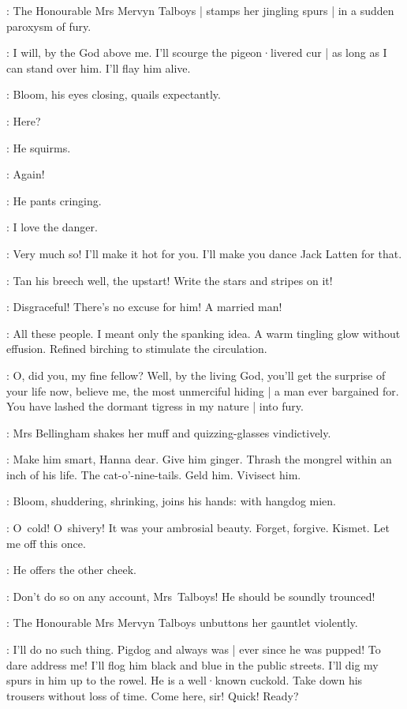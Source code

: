 :
The Honourable Mrs Mervyn Talboys |
stamps her jingling spurs |
in a sudden paroxysm of fury.

\Talboys:
I will,
by the God above me.
I'll scourge the pigeon·livered cur |
as long as I can stand over him.
I'll flay him alive.

:
Bloom,
his eyes closing,
quails expectantly.

\Bloom:
Here?

:
He squirms.

\Bloom:
Again!

:
He pants cringing.

\Bloom:
I love the danger.

\Talboys:
Very much so!
I'll make it hot for you.
I'll make you dance Jack Latten for that.

\Bellingham:
Tan his breech well,
the upstart!
Write the stars and stripes on it!

\Yelverton:
Disgraceful!
There's no excuse for him!
A married man!

\Bloom:
All these people.
I meant only the spanking idea.
A warm tingling glow without effusion.
Refined birching to stimulate the circulation.

\Talboys:
O,
did you,
my fine fellow?
Well,
by the living God,
you'll get the surprise of your life now,
believe me,
the most unmerciful hiding |
a man ever bargained for.
You have lashed the dormant tigress in my nature |
into fury.

:
Mrs Bellingham shakes her muff and quizzing-glasses vindictively.

\Bellingham:
Make him smart,
Hanna dear.
Give him ginger.
Thrash the mongrel within an inch of his life.
The cat-o'-nine-tails.
Geld him.
Vivisect him.

:
Bloom,
shuddering,
shrinking,
joins his hands:
with hangdog mien.

\Bloom:
O~cold!
O~shivery!
It was your ambrosial beauty.
Forget,
forgive.
Kismet.
Let me off this once.

:
He offers the other cheek.

\Yelverton:
Don't do so on any account,
Mrs~Talboys!
He should be soundly trounced!

:
The Honourable Mrs Mervyn Talboys unbuttons her gauntlet violently.

\Talboys:
I'll do no such thing.
Pigdog and always was |
ever since he was pupped!
To dare address me!
I'll flog him black and blue in the public streets.
I'll dig my spurs in him up to the rowel.
He is a well·known cuckold.
Take down his trousers without loss of time.
Come here,
sir!
Quick!
Ready?

